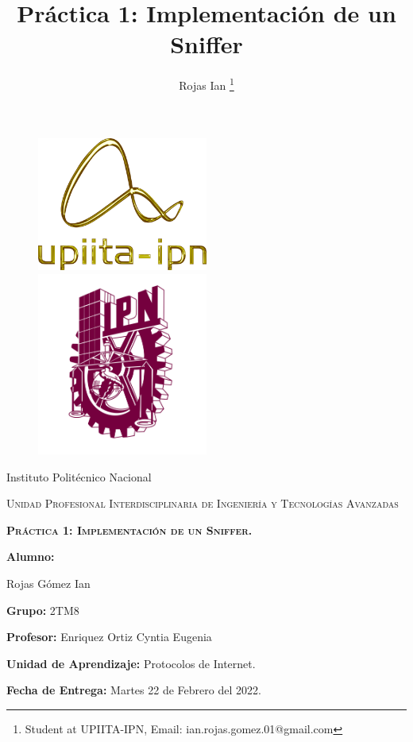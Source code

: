\documentclass[12pt]{report}
\title{Práctica 1: Implementación de un Sniffer}
\author{Rojas Ian \thanks{Student at UPIITA-IPN, Email: ian.rojas.gomez.01@gmail.com }}
\begin{document}
	\setlength{\parindent}{0pt}
	\begin{titlepage}
		
		\begin{figure}[t]
			\raggedright
			\begin{minipage}{0.5\textwidth}
				\raggedright
				{\includegraphics[width=0.5\textwidth]{images/upiita-logo.png}\par}
			\end{minipage}%
			\raggedleft
			\begin{minipage}{0.5\textwidth}
				\raggedleft
				{\includegraphics[width=0.5\textwidth]{images/logo-ipn.png}\par}
			\end{minipage}%
		\end{figure}
		
		\vspace{1cm}
		\centering
		{\LARGE Instituto Polit\'ecnico Nacional \par}
		\vspace{1cm}
		{\scshape\Large Unidad Profesional Interdisciplinaria de Ingenier\'ia y Tecnolog\'ias Avanzadas \par}
		\vspace{3cm}
		{\scshape\Huge \textbf{Práctica 1: Implementación de un Sniffer.} \par}
		\vfill
		{\Large \textbf{Alumno:} \par}
		{\Large Rojas Gómez Ian\par}
		\vspace{0.45cm}
		{\Large \textbf{Grupo:} 2TM8\par}
		{\Large \textbf{Profesor:} Enriquez Ortiz Cyntia Eugenia\par}
		{\Large \textbf{Unidad de Aprendizaje:} Protocolos de Internet. \par}
		{\Large \textbf{Fecha de Entrega:} Martes 22 de Febrero del 2022.\par}
		
	\end{titlepage}
\end{document}
